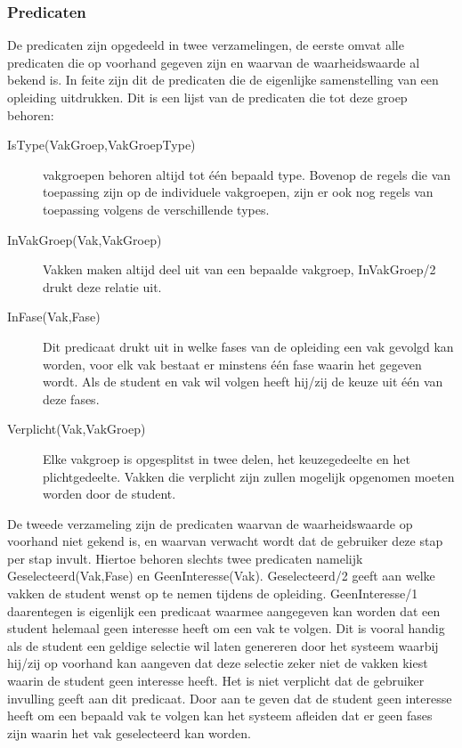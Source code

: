 \subsubsection{Predicaten}
De predicaten zijn opgedeeld in twee verzamelingen, de eerste omvat alle predicaten die op voorhand gegeven zijn en waarvan de waarheidswaarde al bekend is. In feite zijn dit de predicaten die de eigenlijke samenstelling van een opleiding uitdrukken. Dit is een lijst van de predicaten die tot deze groep behoren:
\begin{description}
\item [IsType(VakGroep,VakGroepType)] vakgroepen behoren altijd tot \'{e}\'{e}n bepaald type. Bovenop de regels die van toepassing zijn op de individuele vakgroepen, zijn er ook nog regels van toepassing volgens de verschillende types.
\item [InVakGroep(Vak,VakGroep)] Vakken maken altijd deel uit van een bepaalde vakgroep, InVakGroep/2 drukt deze relatie uit. 
\item [InFase(Vak,Fase)] Dit predicaat drukt uit in welke fases van de opleiding een vak gevolgd kan worden, voor elk vak bestaat er minstens \'{e}\'{e}n fase waarin het gegeven wordt. Als de student en vak wil volgen heeft hij/zij de keuze uit \'{e}\'{e}n van deze fases.
\item [Verplicht(Vak,VakGroep)] Elke vakgroep is opgesplitst in twee delen, het keuzegedeelte en het plichtgedeelte. Vakken die verplicht zijn zullen mogelijk opgenomen moeten worden door de student.
\end{description}

De tweede verzameling zijn de predicaten waarvan de waarheidswaarde op voorhand niet gekend is, en waarvan verwacht wordt dat de gebruiker deze stap per stap invult. Hiertoe behoren slechts twee predicaten namelijk Geselecteerd(Vak,Fase) en GeenInteresse(Vak). Geselecteerd/2 geeft aan welke vakken de student wenst op te nemen tijdens de opleiding. GeenInteresse/1 daarentegen is eigenlijk een predicaat waarmee aangegeven kan worden dat een student helemaal geen interesse heeft om een vak te volgen. Dit is vooral handig als de student een geldige selectie wil laten genereren door het systeem waarbij hij/zij op voorhand kan aangeven dat deze selectie zeker niet de vakken kiest waarin de student geen interesse heeft. Het is niet verplicht dat de gebruiker invulling geeft aan dit predicaat. Door aan te geven dat de student geen interesse heeft om een bepaald vak te volgen kan het systeem afleiden dat er geen fases zijn waarin het vak geselecteerd kan worden.

